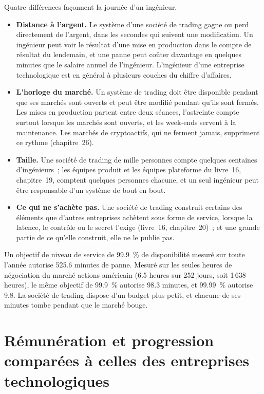 Quatre différences façonnent la journée d'un ingénieur.
\begin{itemize}
\item \textbf{Distance à l'argent.} Le système d'une société de trading gagne ou perd directement de l'argent, dans les secondes qui suivent une modification.
Un ingénieur peut voir le résultat d'une mise en production dans le compte de résultat du lendemain, et une panne peut coûter davantage en quelques minutes
que le salaire annuel de l'ingénieur. L'ingénieur d'une entreprise technologique est en général à plusieurs couches du chiffre d'affaires.
\item \textbf{L'horloge du marché.} Un système de trading doit être disponible pendant que ses marchés sont ouverts et peut être modifié pendant qu'ils sont
fermés. Les mises en production partent entre deux séances, l'astreinte compte surtout lorsque les marchés sont ouverts, et les week-ends servent à la maintenance.
Les marchés de cryptoactifs, qui ne ferment jamais, suppriment ce rythme (chapitre~26).
\item \textbf{Taille.} Une société de trading de mille personnes compte quelques centaines d'ingénieurs~; les équipes produit et les équipes plateforme
du livre~16, chapitre~19, comptent quelques personnes chacune, et un seul ingénieur peut être responsable d'un système de bout en bout.
\item \textbf{Ce qui ne s'achète pas.} Une société de trading construit certains des éléments que d'autres entreprises achètent sous forme de service, lorsque la latence,
le contrôle ou le secret l'exige (livre~16, chapitre~20)~; et une grande partie de ce qu'elle construit, elle ne le publie pas.
\end{itemize}

\begin{example}\label{ex:in:software-engineer:budget}
Un objectif de niveau de service de 99.9~\% de disponibilité mesuré sur toute l'année autorise 525.6 minutes de panne. Mesuré
sur les seules heures de négociation du marché actions américain (6.5 heures sur 252 jours, soit 1\,638 heures), le même objectif de 99.9~\% autorise 98.3 minutes, et 99.99~\%
autorise 9.8. La société de trading dispose d'un budget plus petit, et chacune de ses minutes tombe pendant que le marché bouge.
\end{example}

\section{Rémunération et progression comparées à celles des entreprises technologiques}

